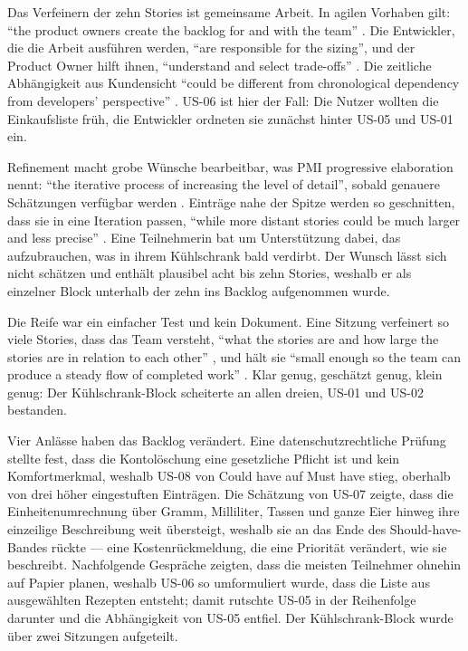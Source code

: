 Das Verfeinern der zehn Stories ist gemeinsame Arbeit. In agilen Vorhaben gilt:
\enquote{the product owners create the backlog for and with the team}
\parencite[p.~41]{pmi2017}. Die Entwickler, die die Arbeit ausführen werden,
\enquote{are responsible for the sizing}, und der Product Owner hilft ihnen,
\enquote{understand and select trade-offs}
\parencite[p.~11]{scrumguide2020}. Die zeitliche Abhängigkeit aus Kundensicht
\enquote{could be different from chronological dependency from developers'
perspective} \parencite[p.~55]{racheva2008}. US-06 ist hier der Fall: Die Nutzer
wollten die Einkaufsliste früh, die Entwickler ordneten sie zunächst hinter
US-05 und US-01 ein.

Refinement macht grobe Wünsche bearbeitbar, was PMI progressive elaboration
nennt: \enquote{the iterative process of increasing the level of detail}, sobald
genauere Schätzungen verfügbar werden \parencite[p.~153]{pmi2017}. Einträge nahe
der Spitze werden so geschnitten, dass sie in eine Iteration passen,
\enquote{while more distant stories
could be much larger and less precise} \parencite[p.~78]{cohn2004}. Eine
Teilnehmerin bat um Unterstützung dabei, das aufzubrauchen, was in ihrem
Kühlschrank bald verdirbt. Der Wunsch lässt sich nicht schätzen und enthält
plausibel acht bis zehn Stories, weshalb er als einzelner Block unterhalb der
zehn ins Backlog aufgenommen wurde.

Die Reife war ein einfacher Test und kein Dokument. Eine Sitzung verfeinert so
viele Stories, dass das Team versteht, \enquote{what the stories are and how large the stories
are in relation to each other} \parencite[p.~52]{pmi2017}, und hält sie
\enquote{small enough so the team can produce a steady flow of completed work}
\parencite[p.~53]{pmi2017}. Klar genug, geschätzt genug, klein genug: Der
Kühlschrank-Block scheiterte an allen dreien, US-01 und US-02 bestanden.

Vier Anlässe haben das Backlog verändert. Eine datenschutzrechtliche Prüfung
stellte fest, dass die Kontolöschung eine gesetzliche Pflicht ist und kein
Komfortmerkmal, weshalb US-08 von Could have auf Must have stieg, oberhalb von
drei höher eingestuften Einträgen. Die Schätzung von US-07 zeigte, dass die
Einheitenumrechnung über Gramm, Milliliter, Tassen und ganze Eier hinweg ihre
einzeilige Beschreibung weit übersteigt, weshalb sie an das Ende des
Should-have-Bandes rückte --- eine Kostenrückmeldung, die eine Priorität
verändert, wie \textcite[p.~100]{cohn2004} sie beschreibt. Nachfolgende Gespräche zeigten, dass die
meisten Teilnehmer ohnehin auf Papier planen, weshalb US-06 so umformuliert
wurde, dass die Liste aus ausgewählten Rezepten entsteht; damit rutschte US-05
in der Reihenfolge darunter und die Abhängigkeit von US-05 entfiel. Der
Kühlschrank-Block wurde über zwei Sitzungen aufgeteilt.

